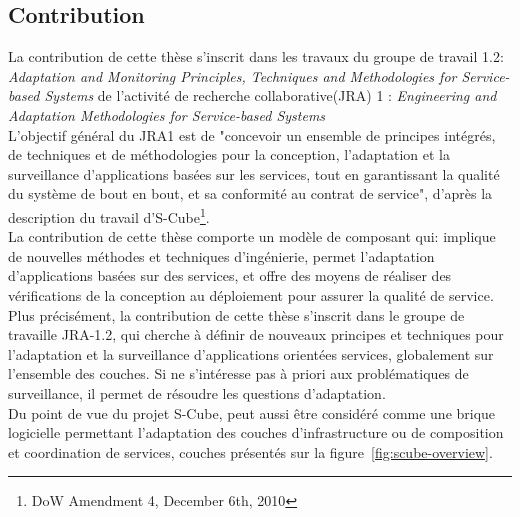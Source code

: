 \subsection{Contribution}


La contribution de cette thèse s'inscrit dans les travaux du groupe de travail 1.2: {\it Adaptation and Monitoring Principles, Techniques and Methodologies for Service-based Systems} de l'activité de recherche collaborative(JRA) 1 : {\it Engineering and Adaptation Methodologies for Service-based Systems}\\

L'objectif général du JRA1 est de "concevoir un ensemble de principes intégrés, de techniques et de méthodologies pour la conception, l'adaptation et la surveillance d'applications basées sur les services, tout en garantissant la qualité du système de bout en bout, et sa conformité au contrat de service", d'après la description du travail d'S-Cube\footnote{DoW Amendment 4, December 6th, 2010}.\\
La contribution de cette thèse comporte un modèle de composant qui: implique de nouvelles méthodes et techniques d'ingénierie, permet l'adaptation d'applications basées sur des services, et offre des moyens de réaliser des vérifications de la conception au déploiement pour assurer la qualité de service.\\

Plus précisément, la contribution de cette thèse s'inscrit dans le groupe de travaille JRA-1.2, qui cherche à définir de nouveaux principes et techniques pour l'adaptation et la surveillance d'applications orientées services, globalement sur l'ensemble des couches. Si \enti{} ne s'intéresse pas à priori aux problématiques de surveillance, il permet de résoudre les questions d'adaptation.\\

Du point de vue du projet S-Cube, \enti{} peut aussi être considéré comme une brique logicielle permettant l'adaptation des couches d'infrastructure ou de composition et coordination de services, couches présentés sur la figure~\ref{fig:scube-overview}. 


